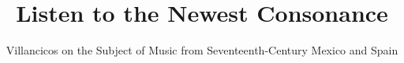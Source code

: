 \documentclass{villancico}
\begin{document}
\frontmatter

\begin{maintitle}
\title{Listen to the Newest Consonance}
\subtitle{Villancicos on the Subject of Music from Seventeenth-Century Mexico and Spain}
\end{maintitle}

\copyrightpage

\tableofcontents

\mainmatter
{}




\end{document}

